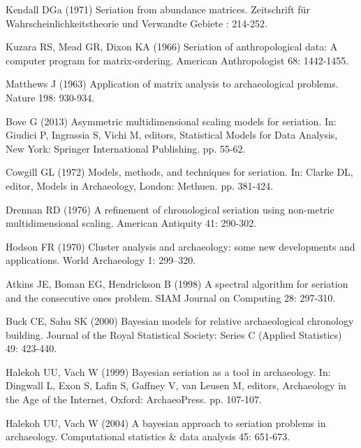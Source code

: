 \documentclass[10pt,letterpaper]{article}
\begin{document}
\begin{thebibliography}{10}
Kendall DGa (1971) Seriation from abundance matrices.
\newblock Zeitschrift f{\"u}r Wahrscheinlichkeitstheorie und Verwandte Gebiete
  : 214-252.

Kuzara RS, Mead GR, Dixon KA (1966) Seriation of anthropological data: A
  computer program for matrix-ordering.
\newblock American Anthropologist 68: 1442-1455.

Matthews J (1963) Application of matrix analysis to archaeological problems.
\newblock Nature 198: 930-934.

Bove G (2013) Asymmetric multidimensional scaling models for seriation.
\newblock In: Giudici P, Ingrassia S, Vichi M, editors, Statistical Models for
  Data Analysis, New York: Springer International Publishing. pp. 55-62.

Cowgill GL (1972) Models, methods, and techniques for seriation.
\newblock In: Clarke DL, editor, Models in Archaeology, London: Methuen. pp.
  381-424.

Drennan RD (1976) A refinement of chronological seriation using non-metric
  multidimensional scaling.
\newblock American Antiquity 41: 290-302.

Hodson FR (1970) Cluster analysis and archaeology: some new developments and
  applications.
\newblock World Archaeology 1: 299--320.

Atkins JE, Boman EG, Hendrickson B (1998) A spectral algorithm for seriation
  and the consecutive ones problem.
\newblock SIAM Journal on Computing 28: 297-310.

Buck CE, Sahu SK (2000) Bayesian models for relative archaeological chronology
  building.
\newblock Journal of the Royal Statistical Society: Series C (Applied
  Statistics) 49: 423-440.

Halekoh UU, Vach W (1999) Bayesian seriation as a tool in archaeology.
\newblock In: Dingwall L, Exon S, Lafin S, Gaffney V, van Leusen M, editors,
  Archaeology in the Age of the Internet, Oxford: ArchaeoPress. pp. 107-107.

Halekoh UU, Vach W (2004) A bayesian approach to seriation problems in
  archaeology.
\newblock Computational statistics \& data analysis 45: 651-673.


\end{thebibliography}
\end{document}
